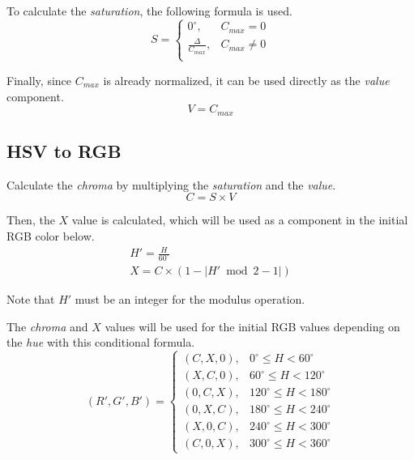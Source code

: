 \documentclass{amsart}
\begin{document}
To calculate the \textit{saturation}, the following formula is used.
\begin{displaymath}
  S =
  \begin{cases}
    0^\circ,                & C_{max} = 0 \\
    \frac{\Delta}{C_{max}}, & C_{max} \neq 0 \\
  \end{cases}
\end{displaymath}

Finally, since $C_{max}$ is already normalized, it can be used directly as the
\textit{value} component.
\begin{displaymath}
  V = C_{max}
\end{displaymath}

\subsection{HSV to RGB}

Calculate the \textit{chroma} by multiplying the \textit{saturation} and the
\textit{value}.
\begin{displaymath}
  C = S \times V
\end{displaymath}

Then, the $X$ value is calculated, which will be used as a component in the
initial RGB color below.
\begin{gather*}
  H' = \frac{H}{60^\circ} \\
  X = C \times \left( 1 - \left| H' \bmod 2 - 1 \right| \right)
\end{gather*}

Note that $H'$ must be an integer for the modulus operation.

The \textit{chroma} and $X$ values will be used for the initial RGB values
depending on the \textit{hue} with this conditional formula.
\begin{displaymath}
  \left( R', G', B' \right) =
  \begin{cases}
    (C, X, 0), & 0^\circ \leq H < 60^\circ \\
    (X, C, 0), & 60^\circ \leq H < 120^\circ \\
    (0, C, X), & 120^\circ \leq H < 180^\circ \\
    (0, X, C), & 180^\circ \leq H < 240^\circ \\
    (X, 0, C), & 240^\circ \leq H < 300^\circ \\
    (C, 0, X), & 300^\circ \leq H < 360^\circ
  \end{cases}
\end{displaymath}
\end{document}
